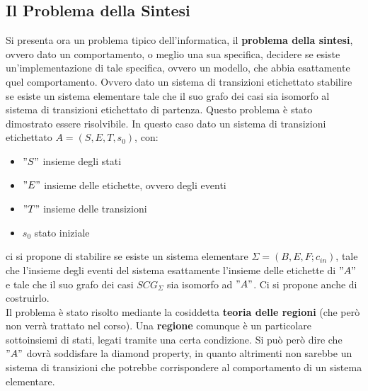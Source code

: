 \subsection{Il Problema della Sintesi}
Si presenta ora un problema tipico dell'informatica, il \textbf{problema della
  sintesi}, ovvero dato un comportamento, o meglio una sua specifica, decidere
se esiste un'implementazione di tale specifica, ovvero un modello, che abbia
esattamente quel comportamento. Ovvero dato un sistema di transizioni etichettato stabilire se esiste un sistema
elementare tale che il suo grafo dei casi sia isomorfo al sistema di transizioni etichettato di
partenza. Questo problema è stato dimostrato essere risolvibile.
In questo caso dato un sistema di transizioni etichettato $A=(S, E, T, s_0)$, con:
\begin{itemize}
  \item $"S"$ insieme degli stati
  \item $"E"$ insieme delle etichette, ovvero degli eventi
  \item $"T"$ insieme delle transizioni
  \item $s_0$ stato iniziale
\end{itemize}

ci si propone di stabilire se esiste un sistema elementare
$\Sigma=(B, E, F;c_{in})$, tale che l'insieme degli eventi del sistema esattamente
l'insieme delle etichette di $"A"$ e tale che il suo grafo dei casi $SCG_\Sigma$
sia isomorfo ad $"A"$. Ci si propone anche di costruirlo.\\
Il problema è stato risolto mediante la cosiddetta \textbf{teoria delle regioni}
(che però non verrà trattato nel corso). Una \textbf{regione} comunque è un
  particolare sottoinsiemi di stati, legati tramite una certa condizione. Si può
  però dire che $"A"$ dovrà 
soddisfare la diamond property, in quanto altrimenti non sarebbe un sistema di
transizioni che potrebbe corrispondere al comportamento di un sistema
elementare.

